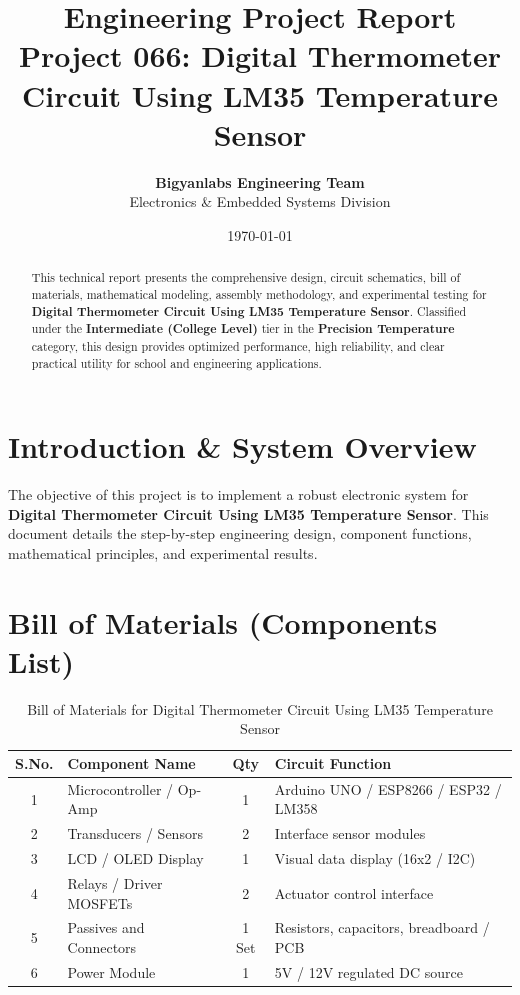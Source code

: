\documentclass[11pt,a4paper]{article}
\title{\textbf{\Huge Engineering Project Report}\\[0.5em] \Large Project 066: Digital Thermometer Circuit Using LM35 Temperature Sensor}
\author{\textbf{Bigyanlabs Engineering Team}\\ Electronics \& Embedded Systems Division}
\date{\today}
\begin{document}
\maketitle
\thispagestyle{empty}

\begin{abstract}
This technical report presents the comprehensive design, circuit schematics, bill of materials, mathematical modeling, assembly methodology, and experimental testing for \textbf{Digital Thermometer Circuit Using LM35 Temperature Sensor}. Classified under the \textbf{Intermediate (College Level)} tier in the \textbf{Precision Temperature} category, this design provides optimized performance, high reliability, and clear practical utility for school and engineering applications.
\end{abstract}

\newpage
\tableofcontents
\newpage

\section{Introduction \& System Overview}
The objective of this project is to implement a robust electronic system for \textbf{Digital Thermometer Circuit Using LM35 Temperature Sensor}. This document details the step-by-step engineering design, component functions, mathematical principles, and experimental results.

\section{Bill of Materials (Components List)}
\begin{table}[h!]
\centering
\caption{Bill of Materials for Digital Thermometer Circuit Using LM35 Temperature Sensor}
\vspace{0.5em}
\begin{tabular}{clcp{7cm}}
\toprule
\textbf{S.No.} & \textbf{Component Name} & \textbf{Qty} & \textbf{Circuit Function} \\
\midrule
1 & Microcontroller / Op-Amp & 1 & Arduino UNO / ESP8266 / ESP32 / LM358 \\
2 & Transducers / Sensors & 2 & Interface sensor modules \\
3 & LCD / OLED Display & 1 & Visual data display (16x2 / I2C) \\
4 & Relays / Driver MOSFETs & 2 & Actuator control interface \\
5 & Passives and Connectors & 1 Set & Resistors, capacitors, breadboard / PCB \\
6 & Power Module & 1 & 5V / 12V regulated DC source \\
\bottomrule
\end{tabular}
\end{table}
\end{document}
